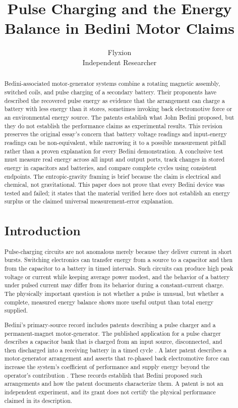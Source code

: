\documentclass[11pt]{article}
\title{Pulse Charging and the Energy Balance in Bedini Motor Claims}
\author{Flyxion \\ \small Independent Researcher}
\date{}
\begin{document}
\maketitle

\begin{abstract}
Bedini-associated motor-generator systems combine a rotating magnetic assembly, switched coils, and pulse charging of a secondary battery. Their proponents have described the recovered pulse energy as evidence that the arrangement can charge a battery with less energy than it stores, sometimes invoking back electromotive force or an environmental energy source. The patents establish what John Bedini proposed, but they do not establish the performance claims as experimental results. This revision preserves the original essay's concern that battery voltage readings and input-energy readings can be non-equivalent, while narrowing it to a possible measurement pitfall rather than a proven explanation for every Bedini demonstration. A conclusive test must measure real energy across all input and output ports, track changes in stored energy in capacitors and batteries, and compare complete cycles using consistent endpoints. The entropic-gravity framing is brief because the claim is electrical and chemical, not gravitational. This paper does not prove that every Bedini device was tested and failed; it states that the material verified here does not establish an energy surplus or the claimed universal measurement-error explanation.

\section{Introduction}

Pulse-charging circuits are not anomalous merely because they deliver current in short bursts. Switching electronics can transfer energy from a source to a capacitor and then from the capacitor to a battery in timed intervals. Such circuits can produce high peak voltage or current while keeping average power modest, and the behavior of a battery under pulsed current may differ from its behavior during a constant-current charge. The physically important question is not whether a pulse is unusual, but whether a complete, measured energy balance shows more useful output than total energy supplied.

Bedini's primary-source record includes patents describing a pulse charger and a permanent-magnet motor-generator. The published application for a pulse charger describes a capacitor bank that is charged from an input source, disconnected, and then discharged into a receiving battery in a timed cycle \cite{Bedini2003}. A later patent describes a motor-generator arrangement and asserts that re-phased back electromotive force can increase the system's coefficient of performance and supply energy beyond the operator's contribution \cite{Bedini2006}. These records establish that Bedini proposed such arrangements and how the patent documents characterize them. A patent is not an independent experiment, and its grant does not certify the physical performance claimed in its description.


\end{abstract}
\end{document}
